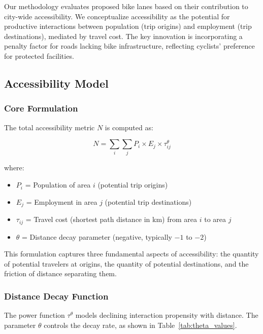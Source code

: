 \documentclass[12pt,a4paper]{article}
\begin{document}
Our methodology evaluates proposed bike lanes based on their contribution to city-wide accessibility. We conceptualize accessibility as the potential for productive interactions between population (trip origins) and employment (trip destinations), mediated by travel cost. The key innovation is incorporating a penalty factor for roads lacking bike infrastructure, reflecting cyclists' preference for protected facilities.

\subsection{Accessibility Model}

\subsubsection{Core Formulation}

The total accessibility metric $N$ is computed as:

\begin{equation}
N = \sum_{i} \sum_{j} P_i \times E_j \times \tau_{ij}^{\theta}
\label{eq:accessibility}
\end{equation}

\noindent where:
\begin{itemize}
    \item $P_i$ = Population of area $i$ (potential trip origins)
    \item $E_j$ = Employment in area $j$ (potential trip destinations)
    \item $\tau_{ij}$ = Travel cost (shortest path distance in km) from area $i$ to area $j$
    \item $\theta$ = Distance decay parameter (negative, typically $-1$ to $-2$)
\end{itemize}

This formulation captures three fundamental aspects of accessibility: the quantity of potential travelers at origins, the quantity of potential destinations, and the friction of distance separating them.

\subsubsection{Distance Decay Function}

The power function $\tau^{\theta}$ models declining interaction propensity with distance. The parameter $\theta$ controls the decay rate, as shown in Table~\ref{tab:theta_values}.
\end{document}
